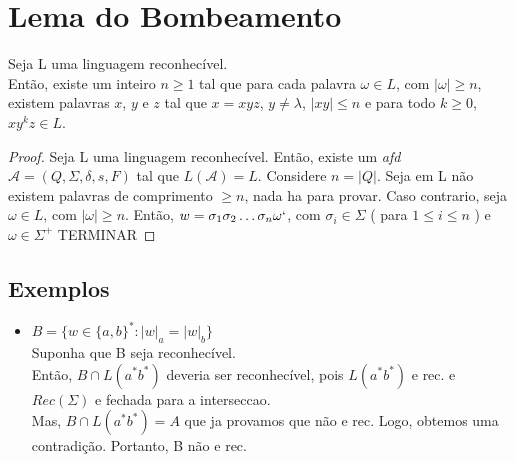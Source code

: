 \documentclass{article}
\begin{document}
\section{Lema do Bombeamento}
    Seja L uma linguagem reconhecível.\\
    Então, existe um inteiro $n \ge 1$ tal que para cada palavra $\omega \in L$, com 
    $|\omega| \ge n$, existem palavras $x$, $y$ e $z$ tal que $x = xyz$, $y \neq \lambda$,
    $|xy| \le n$ e para todo $k \ge 0$, $xy^kz \in L$.

    \begin{proof}
        Seja L uma linguagem reconhecível.
        Então, existe um \emph{afd} $ \mathcal{A} = (Q, \Sigma, \delta, s, F)$ tal que $L(\mathcal{A}) = L.$
        Considere $n = |Q|$.
        Seja em L não existem palavras de comprimento $\ge n$, nada ha para provar.
        Caso contrario, seja $\omega \in L$, com $|\omega| \ge n$.
        Então, $w = \sigma_1\sigma_2\dots\sigma_n\omega`$, com $\sigma_i \in \Sigma$ ( para $1 \le i \le n$ )
        e $\omega \in \Sigma^+$ TERMINAR
    \end{proof}
    
\subsection{Exemplos}
    \begin{itemize}
        \item $B = \{w \in \{a,b\}^* : |w|_a = |w|_b \}$\\
        Suponha que B seja reconhecível. \\
        Então, $ B \cap L(a^*b^*) $ deveria ser reconhecível, pois $ L(a^*b^*) $ e rec. e $ Rec(\Sigma) $ e fechada
        para a interseccao. \\
        Mas, $ B \cap L(a^*b^*) = A $ que ja provamos que não e rec. Logo, obtemos uma contradição. Portanto, B não e rec.
    \end{itemize}
    
    
    
\end{document}
